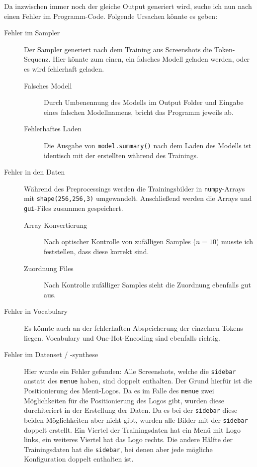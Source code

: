 \documentclass[pdftex,a4paper,halfparskip, article]{scrartcl}
\begin{document}
Da inzwischen immer noch der gleiche Output generiert wird, suche ich nun nach einen Fehler im Programm-Code. Folgende Ursachen könnte es geben:

\begin{description}
	\item[Fehler im Sampler] Der Sampler generiert nach dem Training aus Screenshots die Token-Sequenz. Hier könnte zum einen, ein falsches Modell geladen werden, oder es wird fehlerhaft geladen.
	
	\begin{description}
		\item[Falsches Modell] Durch Umbenennung des Modells im Output Folder und Eingabe eines falschen Modellnamens, bricht das Programm jeweils ab.
		\item[Fehlerhaftes Laden] Die Ausgabe von \texttt{model.summary()} nach dem Laden des Modells ist identisch mit der erstellten während des Trainings.
	\end{description}
	
	\item[Fehler in den Daten] Während des Preprocessings werden die Trainingsbilder in \texttt{numpy}-Arrays mit \texttt{shape(256,256,3)} umgewandelt. Anschließend werden die Arrays und \texttt{gui}-Files zusammen gespeichert.
	
	\begin{description}
		\item[Array Konvertierung] Nach optischer Kontrolle von zufälligen Samples ($n=10$) musste ich feststellen, dass diese korrekt sind.
		\item[Zuordnung Files] Nach Kontrolle zufälliger Samples sieht die Zuordnung ebenfalls gut aus.
	\end{description}
	
	\item[Fehler in Vocabulary] Es könnte auch an der fehlerhaften Abspeicherung der einzelnen Tokens liegen. Vocabulary und One-Hot-Encoding sind ebenfalls richtig.
	
	\item[Fehler im Datenset / -synthese] Hier wurde ein Fehler gefunden: Alle Screenshots, welche die \texttt{sidebar} anstatt des \texttt{menue} haben, sind doppelt enthalten. Der Grund hierfür ist die Positionierung des Menü-Logos. Da es im Falle des \texttt{menue} zwei Möglichkeiten für die Positionierung des Logos gibt, wurden diese durchiteriert in der Erstellung der Daten. Da es bei der \texttt{sidebar} diese beiden Möglichkeiten aber nicht gibt, wurden alle Bilder mit der \texttt{sidebar} doppelt erstellt. Ein Viertel der Trainingsdaten hat ein Menü mit Logo links, ein weiteres Viertel hat das Logo rechts. Die andere Hälfte der Trainingsdaten hat die \texttt{sidebar}, bei denen aber jede mögliche Konfiguration doppelt enthalten ist.
	
\end{description}
\end{document}
